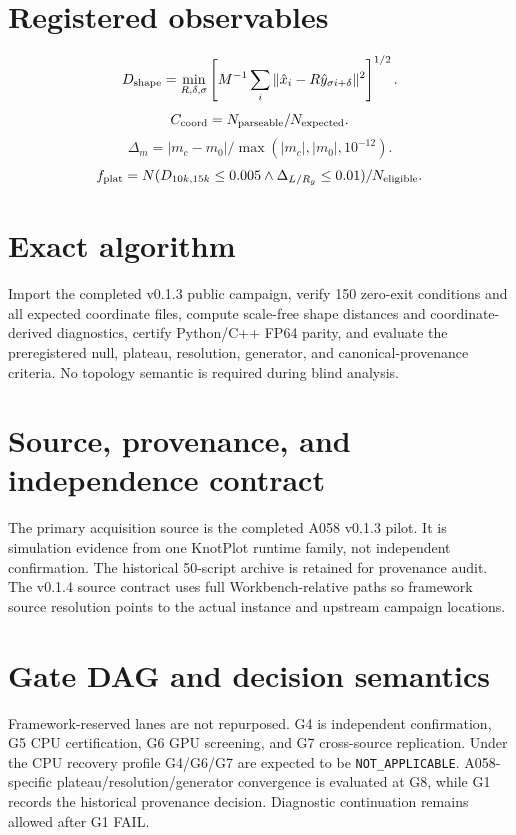 \documentclass[11pt,a4paper]{article}
\newcommand{\code}[1]{\texttt{#1}}
\begin{document}
\section{Registered observables}
\begin{equation}
D_{\rm shape}=\min_{R,\delta,\sigma}\left[M^{-1}\sum_i\|\hat{x}_i-R\hat{y}_{\sigma i+\delta}\|^2\right]^{1/2}.
\end{equation}
\begin{equation}C_{\rm coord}=N_{\rm parseable}/N_{\rm expected}.\end{equation}
\begin{equation}\Delta_m=|m_c-m_0|/\max(|m_c|,|m_0|,10^{-12}).\end{equation}
\begin{equation}f_{\rm plat}=N(D_{10k,15k}\le0.005\wedge \Delta_{L/R_g}\le0.01)/N_{\rm eligible}.\end{equation}
\section{Exact algorithm}
Import the completed v0.1.3 public campaign, verify 150 zero-exit conditions and all expected coordinate files, compute scale-free shape distances and coordinate-derived diagnostics, certify Python/C++ FP64 parity, and evaluate the preregistered null, plateau, resolution, generator, and canonical-provenance criteria. No topology semantic is required during blind analysis.
\section{Source, provenance, and independence contract}
The primary acquisition source is the completed A058 v0.1.3 pilot. It is simulation evidence from one KnotPlot runtime family, not independent confirmation. The historical 50-script archive is retained for provenance audit. The v0.1.4 source contract uses full Workbench-relative paths so framework source resolution points to the actual instance and upstream campaign locations.
\section{Gate DAG and decision semantics}
Framework-reserved lanes are not repurposed. G4 is independent confirmation, G5 CPU certification, G6 GPU screening, and G7 cross-source replication. Under the CPU recovery profile G4/G6/G7 are expected to be \code{NOT\_APPLICABLE}. A058-specific plateau/resolution/generator convergence is evaluated at G8, while G1 records the historical provenance decision. Diagnostic continuation remains allowed after G1 FAIL.
\end{document}
